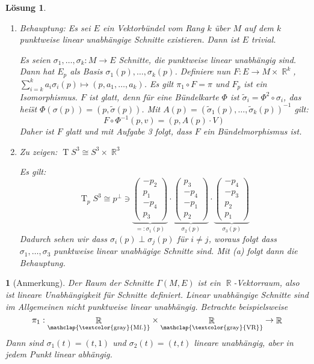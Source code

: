 \documentclass[paper=A4, twoside, chapterprefix=true, bibliography=totoc, headsepline]{scrbook}
\DeclareMathOperator{\R}{\mathbb{R}}
\DeclareMathOperator{\T}{T}         %
\newcommand{\X}{\times}
\theoremstyle{plain}
\theoremstyle{nonumberplain}
\theoremstyle{empty}
\newtheorem{emptythm}{}%
\theoremstyle{break}
\newtheorem{Loes}{L\"osung}
\begin{document}
\begin{Loes}\begin{enumerate}[label=(\alph*),leftmargin=*,widest=a]
\item
	\emph{Behauptung:} Es sei $E$ ein Vektorb\"undel vom Rang $k$ \"uber $M$ auf dem $k$ punktweise linear unabh\"angige Schnitte existieren. Dann ist $E$ trivial.
	
	Es seien $\sigma_1, \ldots, \sigma_k: M \to E$ Schnitte, die punktweise linear unabh\"angig sind. Dann hat $E_p$ als Basis $\sigma_1(p),\ldots ,\sigma_k(p)$. Definiere nun $F: E \to M \X \R^k$, $\sum_{i=k}^k a_i \sigma_i(p) \mapsto (p, a_1,\ldots ,a_k)$. Es gilt $\pi_1 \circ F = \pi$ und $F_p$ ist ein Isomorphismus. $F$ ist glatt, denn f\"ur eine B\"undelkarte $\Phi$ ist $\tilde \sigma_i = \Phi^2 \circ \sigma_i$, das hei\"st $\Phi(\sigma(p)) = (p, \tilde\sigma(p))$. Mit $A(p) = (\tilde\sigma_1(p),\ldots ,\tilde\sigma_k(p))^{-1}$ gilt:
	\[ F \circ \Phi^{-1}(p,v) = (p, A(p) \cdot V) \]
Daher ist $F$ glatt und mit Aufgabe 3 folgt, dass $F$ ein B\"undelmorphismus ist.
\item
	\emph{Zu zeigen:} $\T S^3 \cong S^3 \X \R^3$
	
	Es gilt:
		\[ \T_pS^3 \cong p^\perp \ni \underbrace{\begin{pmatrix} -p_2 \\ p_1 \\ -p_4 \\ p_3 \end{pmatrix}}_{=:\sigma_1(p)} \cdot \underbrace{\begin{pmatrix} p_3 \\ -p_4 \\ -p_1 \\ p_2 \end{pmatrix}}_{\sigma_2(p)} \cdot \underbrace{\begin{pmatrix} -p_4 \\ -p_3 \\ p_2 \\ p_1 \end{pmatrix}}_{\sigma_3(p)} \]
	Dadurch sehen wir dass $\sigma_i(p) \perp \sigma_j(p)$ f\"ur $ i \ne j$, woraus folgt dass $\sigma_1, \ldots ,\sigma_3$ punktweise linear unabh\"agige Schnitte sind. Mit (a) folgt dann die Behauptung.
\end{enumerate}\end{Loes}

\begin{emptythm}[Anmerkung]
Der Raum der Schnitte $\Gamma(M,E)$ ist ein $\R$-Vektorraum, also ist lineare Unabh\"angigkeit f\"ur Schnitte definiert. Linear unabh\"angige Schnitte sind im Allgemeinen \emph{nicht} punktweise linear unabh\"angig. Betrachte beispielsweise
	\[ \pi_1: \underset{\mathclap{\text{\textcolor{gray}{Mf.}}}}{\R} \X \underset{\mathclap{\text{\textcolor{gray}{VR}}}}{\R} \to \R \]
Dann sind $\sigma_1(t) = (t,1)$ und $\sigma_2(t) = (t,t)$ lineare unabh\"angig, aber in jedem Punkt linear abh\"angig.
\end{emptythm}
\end{document}
